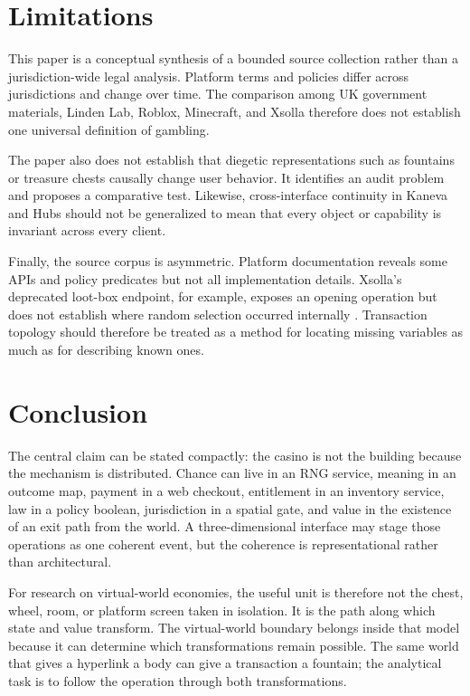 \documentclass[11pt]{article}
\begin{document}
\section{Limitations}
This paper is a conceptual synthesis of a bounded source collection rather than a jurisdiction-wide legal analysis. Platform terms and policies differ across jurisdictions and change over time. The comparison among UK government materials, Linden Lab, Roblox, Minecraft, and Xsolla therefore does not establish one universal definition of gambling.

The paper also does not establish that diegetic representations such as fountains or treasure chests causally change user behavior. It identifies an audit problem and proposes a comparative test. Likewise, cross-interface continuity in Kaneva and Hubs should not be generalized to mean that every object or capability is invariant across every client.

Finally, the source corpus is asymmetric. Platform documentation reveals some APIs and policy predicates but not all implementation details. Xsolla's deprecated loot-box endpoint, for example, exposes an opening operation but does not establish where random selection occurred internally \parencite{xsolla_open_lootbox_api}. Transaction topology should therefore be treated as a method for locating missing variables as much as for describing known ones.

\section{Conclusion}
The central claim can be stated compactly: the casino is not the building because the mechanism is distributed. Chance can live in an RNG service, meaning in an outcome map, payment in a web checkout, entitlement in an inventory service, law in a policy boolean, jurisdiction in a spatial gate, and value in the existence of an exit path from the world. A three-dimensional interface may stage those operations as one coherent event, but the coherence is representational rather than architectural.

For research on virtual-world economies, the useful unit is therefore not the chest, wheel, room, or platform screen taken in isolation. It is the path along which state and value transform. The virtual-world boundary belongs inside that model because it can determine which transformations remain possible. The same world that gives a hyperlink a body can give a transaction a fountain; the analytical task is to follow the operation through both transformations.
\end{document}

